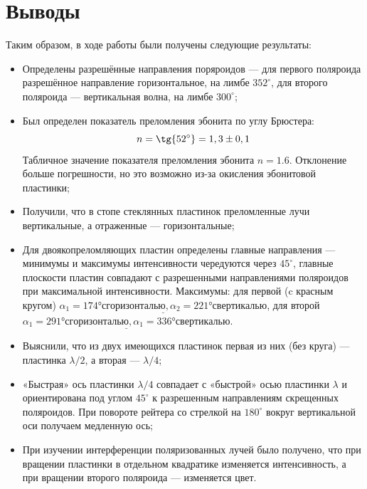 \documentclass[11pt]{article}
\begin{document}
\section{Выводы}
Таким образом, в ходе работы были получены следующие результаты:
\begin{itemize}
\item Определены разрешённые направления поряроидов --- для первого поляроида разрешённое направление горизонтальное, на лимбе $352^{\circ}$, для второго поляроида --- вертикальная волна, на лимбе $300^{\circ}$;
\item Был определен показатель преломления эбонита по углу Брюстера:
\begin{equation*}
    n = \tg{52^{\circ}} = 1,3 \pm 0,1
\end{equation*}
Табличное значение показателя преломления эбонита $ n = 1.6 $. Отклонение больше погрешности, но это возможно из-за окисления эбонитовой пластинки;
\item Получили, что в стопе стеклянных пластинок преломленные лучи вертикальные, а отраженные --- горизонтальные;
\item Для двоякопреломляющих пластин определены главные направления --- минимумы и
максимумы интенсивности чередуются через $45^{\circ}$, главные плоскости пластин совпадают с разрешенными направлениями поляроидов при максимальной интенсивности.  Максимумы: для первой (c красным кругом) $ \underline{\alpha_1 = 174 ° с горизонталью, \alpha_2 = 221 ° с вертикалью}$, для второй $\underline{ \alpha_1 = 291 ° с горизонталью, \alpha_1 = 336 ° с вертикалью}$.

\item Выяснили, что из двух имеющихся пластинок первая из них (без круга) --- пластинка $\lambda/2$, а вторая --- $\lambda/4$;

\item «Быстрая» ось пластинки $\lambda/4$ совпадает с «быстрой» осью пластинки $\lambda$ и ориентирована под углом $45^{\circ}$ к разрешенным направлениям скрещенных поляроидов. При повороте рейтера со стрелкой на $180^{\circ}$ вокруг вертикальной оси получаем медленную ось;

\item При изучении интерференции поляризованных лучей было получено, что при вращении пластинки в отдельном квадратике изменяется интенсивность, а при вращении второго поляроида --- изменяется цвет.

\end{itemize}
\end{document}
